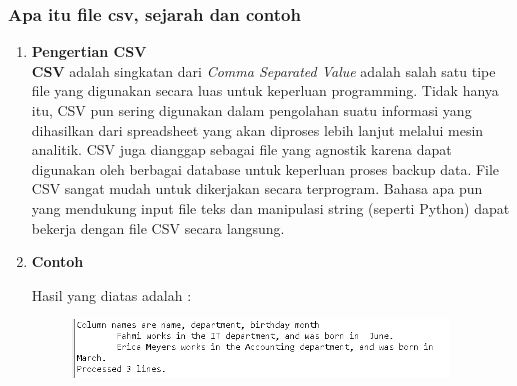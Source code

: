 \subsubsection{Apa itu file csv, sejarah dan contoh}
\begin{enumerate}
	\item \textbf{Pengertian CSV} \\
	\textbf{CSV} adalah singkatan dari \textit{Comma Separated Value} adalah salah satu tipe file yang digunakan secara luas untuk keperluan programming. Tidak hanya itu, CSV pun sering digunakan dalam pengolahan suatu informasi yang dihasilkan dari spreadsheet yang akan diproses lebih lanjut melalui mesin analitik. CSV juga dianggap sebagai file yang agnostik karena dapat digunakan oleh berbagai database untuk keperluan proses backup data. File CSV sangat mudah untuk dikerjakan secara terprogram. Bahasa apa pun yang mendukung input file teks dan manipulasi string (seperti Python) dapat bekerja dengan file CSV secara langsung.
	
	\item \textbf{Contoh}
	
	
	Hasil yang diatas adalah : 
	\begin{figure}[H]
		\includegraphics[width=10cm]{figures/fahmi/7.png}
		\centering
	\end{figure}
	
	
\end{enumerate}

